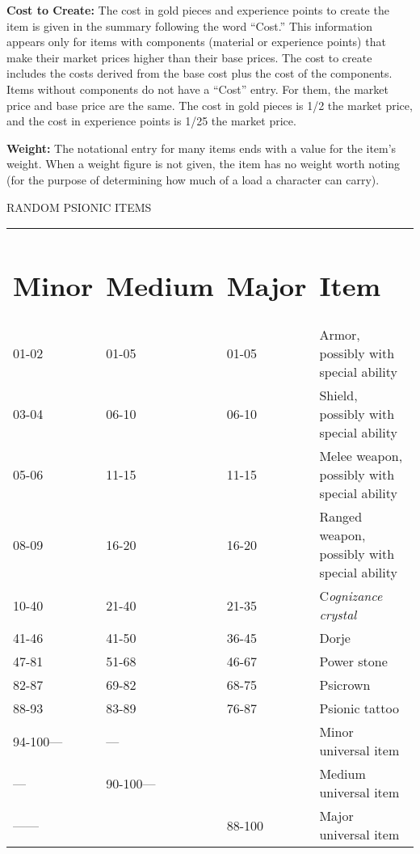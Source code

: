 \documentclass{article}
\begin{document}
\textbf{Cost to Create:} The cost in gold pieces and experience points to create 
the item is given in the summary following the word ``Cost.'' This information 
appears only for items with components (material or experience points) that make 
their market prices higher than their base prices. The cost to create includes 
the costs derived from the base cost plus the cost of the components. Items without 
components do not have a ``Cost'' entry. For them, the market price and base price 
are the same. The cost in gold pieces is 1/2 the market price, and the cost in 
experience points is 1/25 the market price. 

\textbf{Weight: }The notational entry for many items ends with a value for the 
item's weight. When a weight figure is not given, the item has no weight worth 
noting (for the purpose of determining how much of a load a character can carry).

\vspace{12pt}
RANDOM PSIONIC ITEMS

\begin{tabular}{|>{\raggedright}p{28pt}|>{\raggedright}p{34pt}|>{\raggedright}p{28pt}|>{\raggedright}p{179pt}|}
\hline
\multicolumn{4}{|p{272pt}|}{T\textbf{able: Random Psionic Item Generation}}\tabularnewline
\hline
\section*{M\textbf{inor}} & \section*{M\textbf{edium}} & \section*{M\textbf{ajor}} & \section*{I\textbf{tem}}\tabularnewline
\hline
01-02 & 01-05 & 01-05 & Armor, possibly with special ability\tabularnewline
\hline
03-04 & 06-10 & 06-10 & Shield, possibly with special ability\tabularnewline
\hline
05-06 & 11-15 & 11-15 & Melee weapon, possibly with special ability\tabularnewline
\hline
08-09 & 16-20 & 16-20 & Ranged weapon, possibly with special ability\tabularnewline
\hline
10-40 & 21-40 & 21-35 & C\textit{ognizance crystal}\tabularnewline
\hline
41-46 & 41-50 & 36-45 & Dorje\tabularnewline
\hline
47-81 & 51-68 & 46-67 & Power stone\tabularnewline
\hline
82-87 & 69-82 & 68-75 & Psicrown\tabularnewline
\hline
88-93 & 83-89 & 76-87 & Psionic tattoo\tabularnewline
\hline
94-100--- & --- &  & Minor universal item\tabularnewline
\hline
--- & 90-100--- &  & Medium universal item\tabularnewline
\hline
------ &  & 88-100 & Major universal item\tabularnewline
\hline
\end{tabular}
\end{document}
